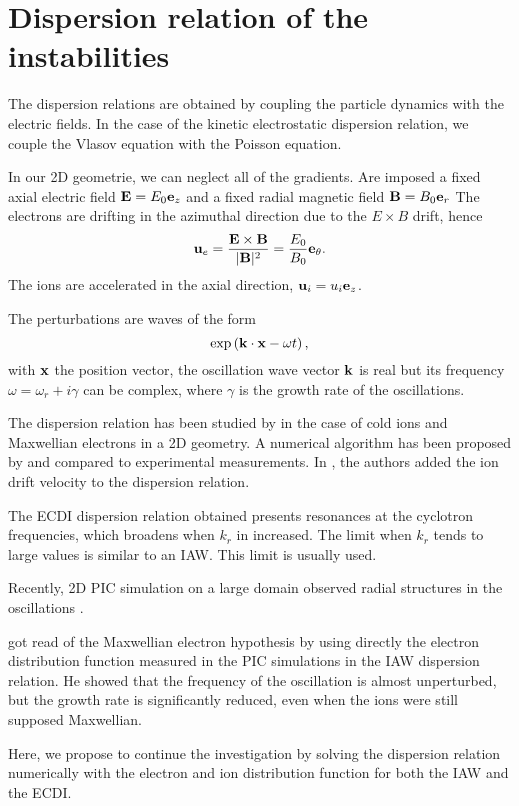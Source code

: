 
\section{Dispersion relation of the instabilities}
  \label{sec-DR-kinetic}
  
  
  The dispersion relations are obtained by coupling the particle dynamics with the electric fields.
  In the case of the kinetic electrostatic dispersion relation, we couple the Vlasov equation with the Poisson equation.
  
  In our \ac{2D} geometrie, we can neglect all of the gradients.
  Are imposed a fixed axial electric field ${\mathbf E} = E_0 {\mathbf e_z}$ and a fixed radial magnetic field ${\mathbf B} = B_0 {\mathbf e_r}$
  The electrons are drifting in the azimuthal direction due to the $E\times B$ drift, hence
  \[ {\mathbf u_{e}} = \frac{{\mathbf E} \times {\mathbf B}}{\lvert{\mathbf B}\rvert^2} = \frac{E_0}{B_0}  {\mathbf e_{\theta}}.    \]
  The ions are accelerated in the axial direction, $ {\mathbf u_i} = u_i  {\mathbf e_z}$.
  
  The perturbations are waves of the form \[ \exp \left( {\mathbf k} \cdot {\mathbf x} - \omega t  \right), \]
  with ${\mathbf x}$ the position vector, the oscillation wave vector ${\mathbf k}$ is real but its frequency $\omega = \omega_r + i \gamma$ can be complex, where $\gamma$ is the growth rate of the oscillations. 
  
  \vspace{1em}
  The dispersion relation has been studied by \citet{ducrocq2006} in the case of cold ions and Maxwellian electrons in a \ac{2D} geometry.
  A numerical algorithm has been proposed by \citet{cavalier2013} and compared to experimental measurements.
  In \citet{lafleur2016}, the authors added the ion drift velocity to the dispersion relation.
  
  The \ac{ECDI} dispersion relation obtained presents resonances at the cyclotron frequencies, which broadens when $k_r$ in increased.
  The limit when $k_r$ tends to large values is similar to an \ac{IAW}.
  This limit is usually used.
  
  Recently, \ac{2D} \ac{PIC} simulation on a large domain observed radial structures in the oscillations \citep{janhunen2018,hara2019a}.
  
  \citet{lafleur2018} got read of the Maxwellian electron hypothesis by using directly the electron distribution function measured in the \ac{PIC} simulations in the \ac{IAW} dispersion relation.
  He showed that the frequency of the oscillation is almost unperturbed, but the growth rate is significantly reduced, even when the ions were still supposed Maxwellian.
  
  Here, we propose to continue the investigation by solving the dispersion relation numerically with the electron and ion distribution function for both the \ac{IAW} and the \ac{ECDI}.
  
  